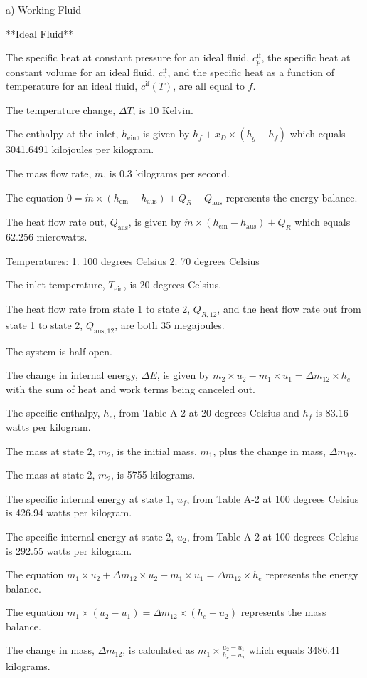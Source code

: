 a) Working Fluid

**Ideal Fluid**

The specific heat at constant pressure for an ideal fluid, \( c_p^{\text{if}} \), the specific heat at constant volume for an ideal fluid, \( c_v^{\text{if}} \), and the specific heat as a function of temperature for an ideal fluid, \( c^{\text{if}}(T) \), are all equal to \( f \).

The temperature change, \( \Delta T \), is 10 Kelvin.

The enthalpy at the inlet, \( h_{\text{ein}} \), is given by \( h_f + x_D \times (h_g - h_f) \) which equals 3041.6491 kilojoules per kilogram.

The mass flow rate, \( \dot{m} \), is 0.3 kilograms per second.

The equation \( 0 = \dot{m} \times (h_{\text{ein}} - h_{\text{aus}}) + \dot{Q}_R - \dot{Q}_{\text{aus}} \) represents the energy balance.

The heat flow rate out, \( \dot{Q}_{\text{aus}} \), is given by \( \dot{m} \times (h_{\text{ein}} - h_{\text{aus}}) + \dot{Q}_R \) which equals 62.256 microwatts.

Temperatures:
1. 100 degrees Celsius
2. 70 degrees Celsius

The inlet temperature, \( T_{\text{ein}} \), is 20 degrees Celsius.

The heat flow rate from state 1 to state 2, \( Q_{R,12} \), and the heat flow rate out from state 1 to state 2, \( Q_{\text{aus},12} \), are both 35 megajoules.

The system is half open.

The change in internal energy, \( \Delta E \), is given by \( m_2 \times u_2 - m_1 \times u_1 = \Delta m_{12} \times h_e \) with the sum of heat and work terms being canceled out.

The specific enthalpy, \( h_e \), from Table A-2 at 20 degrees Celsius and \( h_f \) is 83.16 watts per kilogram.

The mass at state 2, \( m_2 \), is the initial mass, \( m_1 \), plus the change in mass, \( \Delta m_{12} \).

The mass at state 2, \( m_2 \), is 5755 kilograms.

The specific internal energy at state 1, \( u_f \), from Table A-2 at 100 degrees Celsius is 426.94 watts per kilogram.

The specific internal energy at state 2, \( u_2 \), from Table A-2 at 100 degrees Celsius is 292.55 watts per kilogram.

The equation \( m_1 \times u_2 + \Delta m_{12} \times u_2 - m_1 \times u_1 = \Delta m_{12} \times h_e \) represents the energy balance.

The equation \( m_1 \times (u_2 - u_1) = \Delta m_{12} \times (h_e - u_2) \) represents the mass balance.

The change in mass, \( \Delta m_{12} \), is calculated as \( m_1 \times \frac{u_2 - u_1}{h_e - u_2} \) which equals 3486.41 kilograms.